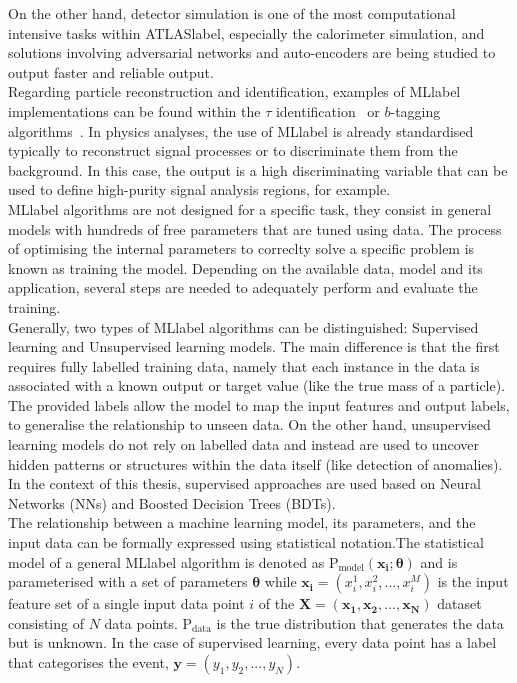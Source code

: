 On the other hand, detector simulation is one of the most computational intensive tasks within \acrshort{ATLASlabel}, especially the calorimeter simulation, and solutions involving adversarial networks and auto-encoders are being studied to output faster and reliable output.\\

Regarding particle reconstruction and identification, examples of \acrshort{MLlabel} implementations can be found within the $\tau$ identification~\cite{ATLAS:2019uhp} or $b$-tagging algorithms~\cite{ATL-PHYS-PUB-2020-014}. In physics analyses, the use of \acrshort{MLlabel} is already standardised typically to reconstruct signal processes or to discriminate them from the background. In this case, the output is a high discriminating variable that can be used to define high-purity signal analysis regions, for example.\\

\acrshort{MLlabel} algorithms are not designed for a specific task, they consist in general models with hundreds of free parameters that are tuned using data. The process of optimising the internal parameters to correclty solve a specific problem is known as training the model. Depending on the available data, model and its application, several steps are needed to adequately perform and evaluate the training.\\

Generally, two types of \acrshort{MLlabel} algorithms can be distinguished: Supervised learning and Unsupervised learning models. The main difference is that the first requires fully labelled training data, namely that each instance in the data is associated with a known output or target value (like the true mass of a particle). The provided labels allow the model to map the input features and output labels, to generalise the relationship to unseen data. On the other hand, unsupervised learning models do not rely on labelled data and instead are used to uncover hidden patterns or structures within the data itself (like detection of anomalies). In the context of this thesis, supervised approaches are used based on Neural Networks (NNs) and Boosted Decision Trees (BDTs).\\

The relationship between a machine learning model, its parameters, and the input data can be formally expressed using statistical notation.The statistical model of a general \acrshort{MLlabel} algorithm is denoted as $\text{P}_\text{model}(\mathbf{x_i}; \boldsymbol{\theta})$ and is parameterised with a set of parameters $\boldsymbol{\theta}$ while $\mathbf{x_i}=(x_i^1,x_i^2,...,x_i^M)$ is the input feature set of a single input data point $i$ of the $\mathbf{X}=(\mathbf{x_1},\mathbf{x_2},...,\mathbf{x_N})$ dataset consisting of $N$ data points. $\text{P}_\text{data}$ is the true distribution that generates the data but is unknown. In the case of supervised learning, every data point has a label that categorises the event, $\mathbf{y}=(y_1,y_2,...,y_N)$.

